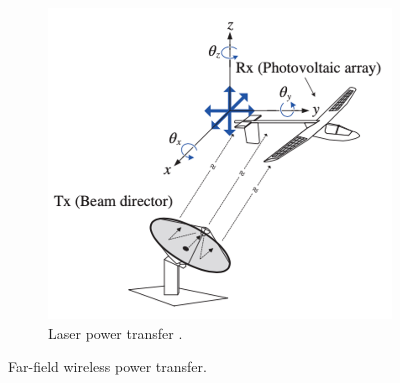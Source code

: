 \begin{figure}[htbp]
\begin{subfigure}{0.5\textwidth}
        \includegraphics[width=0.9\linewidth]{images/1_laser_power_transfer.png}
        \caption{Laser power transfer \cite{Chun}.}
        \label{fig:subim2}
    \end{subfigure}

    \caption{Far-field wireless power transfer.}
    \label{fig:image2}
\end{figure}

